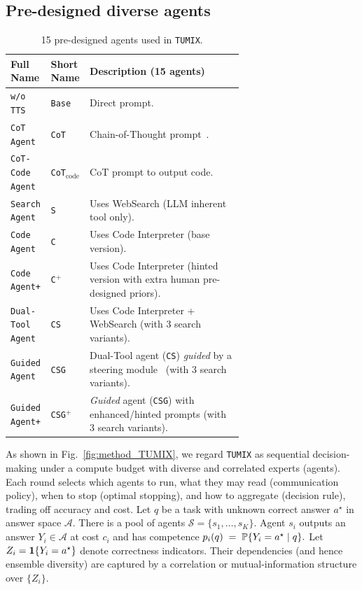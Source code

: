 \subsection{Pre-designed diverse agents}
\label{subsection:Pre-designed diverse agents}
\vspace{-6pt}
\begin{table}[t]
\centering
\caption{15 pre-designed agents used in \texttt{TUMIX}.}
\label{tab:agent_variants}
\footnotesize
\setlength{\tabcolsep}{4pt}
\renewcommand{\arraystretch}{1.05}
\begin{tabular}{@{}llp{0.66\linewidth}@{}}
\hline
\textbf{Full Name} & \textbf{Short Name} & \textbf{Description (15 agents)} \\
\hline
\texttt{w/o TTS}   & \texttt{Base}         & Direct prompt. \\
\texttt{CoT Agent}        & \texttt{CoT}         & Chain-of-Thought prompt~\citep{CoT}. \\
\texttt{CoT-Code Agent}  & \texttt{CoT$_{\text{code}}$}       & CoT prompt to output code. \\
\texttt{Search Agent}     & \texttt{S} & Uses WebSearch (LLM inherent tool only). \\
\texttt{Code Agent}       & \texttt{C}            & Uses Code Interpreter (base version). \\
\texttt{Code Agent+}      & \texttt{C$^{+}$}      & Uses Code Interpreter (hinted version with extra human pre-designed priors). \\
\texttt{Dual-Tool Agent} & \texttt{CS}           & Uses Code Interpreter + WebSearch (with 3 search variants). \\
\texttt{Guided Agent}     & \texttt{CSG}          & Dual-Tool agent (\texttt{CS}) \textit{guided} by a steering module~\citep{codesteer} (with 3 search variants). \\
\texttt{Guided Agent+}    & \texttt{CSG$^{+}$}    & \textit{Guided} agent (\texttt{CSG}) with enhanced/hinted prompts (with 3 search variants). \\
\hline
\end{tabular}
\vspace{-2mm}
\end{table}

As shown in Fig.~\ref{fig:method_TUMIX}, we regard \texttt{TUMIX} as sequential decision-making under a compute budget with diverse and correlated experts (agents). 
Each round selects which agents to run, what they may read (communication policy), when to stop (optimal stopping), and how to aggregate (decision rule), trading off accuracy and cost. Let \(q\) be a task with unknown correct answer \(a^\star\) in answer space \(\mathcal{A}\). There is a pool of agents \(\mathcal{S}=\{s_1,\dots,s_K\}\). Agent \(s_i\) outputs an answer \(Y_i\in\mathcal{A}\) at cost \(c_i\) and has competence
$
  p_i(q) \;=\; \mathbb{P}\{Y_i = a^\star \mid q\}.
$
Let \(Z_i=\mathbf{1}\{Y_i=a^\star\}\) denote correctness indicators. Their dependencies (and hence ensemble diversity) are captured by a correlation or mutual-information structure over \(\{Z_i\}\).


